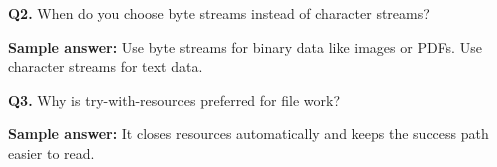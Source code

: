 \documentclass[11pt]{article}
\begin{document}
\vspace{0.6em}
\textbf{Q2.} When do you choose byte streams instead of character streams?\par
\textbf{Sample answer:} Use byte streams for binary data like images or PDFs. Use character streams for text data.

\vspace{0.6em}
\textbf{Q3.} Why is try-with-resources preferred for file work?\par
\textbf{Sample answer:} It closes resources automatically and keeps the success path easier to read.
\end{document}
